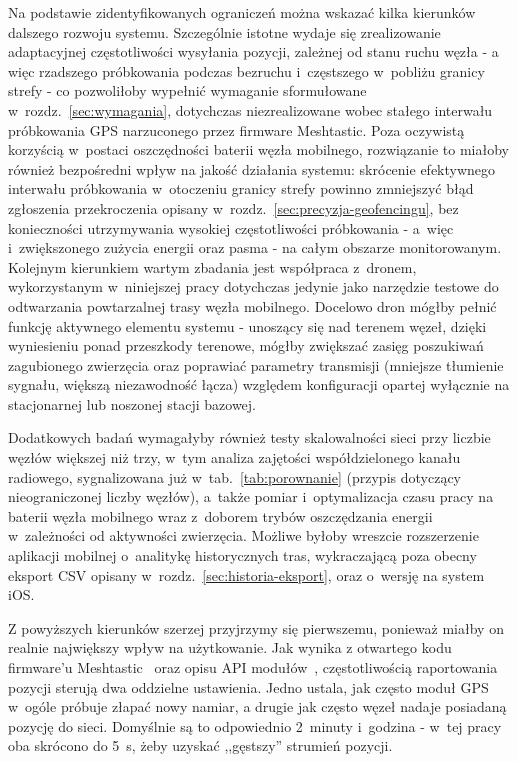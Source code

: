 Na podstawie zidentyfikowanych ograniczeń można wskazać kilka kierunków dalszego rozwoju systemu.
Szczególnie istotne wydaje się zrealizowanie adaptacyjnej częstotliwości wysyłania pozycji,
zależnej od stanu ruchu węzła - a więc rzadszego próbkowania podczas bezruchu i~częstszego
w~pobliżu granicy strefy - co pozwoliłoby wypełnić wymaganie sformułowane w~rozdz.~\ref{sec:wymagania},
dotychczas niezrealizowane wobec stałego interwału próbkowania GPS narzuconego przez firmware
Meshtastic. Poza oczywistą korzyścią w~postaci oszczędności baterii węzła mobilnego, rozwiązanie
to miałoby również bezpośredni wpływ na jakość działania systemu: skrócenie efektywnego interwału
próbkowania w~otoczeniu granicy strefy powinno zmniejszyć błąd zgłoszenia przekroczenia opisany
w~rozdz.~\ref{sec:precyzja-geofencingu}, bez konieczności utrzymywania wysokiej częstotliwości
próbkowania - a~więc i~zwiększonego zużycia energii oraz pasma - na całym obszarze monitorowanym.
Kolejnym kierunkiem wartym zbadania jest współpraca z~dronem, wykorzystanym w~niniejszej
pracy dotychczas jedynie jako narzędzie testowe do odtwarzania powtarzalnej trasy węzła mobilnego.
Docelowo dron mógłby pełnić funkcję aktywnego elementu systemu - unoszący się nad terenem węzeł, 
dzięki wyniesieniu ponad przeszkody terenowe, mógłby zwiększać zasięg poszukiwań zagubionego 
zwierzęcia oraz poprawiać parametry transmisji (mniejsze tłumienie sygnału, większą niezawodność łącza)
względem konfiguracji opartej wyłącznie na stacjonarnej lub noszonej stacji bazowej.

Dodatkowych badań wymagałyby również testy skalowalności sieci przy liczbie węzłów większej niż
trzy, w~tym analiza zajętości współdzielonego kanału radiowego, sygnalizowana już w~tab.~\ref{tab:porownanie}
(przypis dotyczący nieograniczonej liczby węzłów), a~także pomiar i~optymalizacja czasu pracy na
baterii węzła mobilnego wraz z~doborem trybów oszczędzania energii w~zależności od aktywności
zwierzęcia. Możliwe byłoby wreszcie rozszerzenie aplikacji mobilnej o~analitykę historycznych tras,
wykraczającą poza obecny eksport CSV opisany w~rozdz.~\ref{sec:historia-eksport}, oraz o~wersję
na system iOS.

Z powyższych kierunków szerzej przyjrzymy się pierwszemu, ponieważ miałby on realnie największy wpływ na użytkowanie.
Jak wynika z otwartego kodu firmware'u Meshtastic~\cite{meshtasticFirmwareRepo} oraz opisu API
modułów~\cite{meshtasticModuleApiDocs}, częstotliwością raportowania pozycji sterują dwa oddzielne ustawienia. Jedno ustala, jak często moduł GPS
w~ogóle próbuje złapać nowy namiar, a drugie jak często węzeł nadaje posiadaną pozycję do sieci.
Domyślnie są to odpowiednio 2~minuty i~godzina - w~tej pracy oba skrócono do 5~s, żeby uzyskać
,,gęstszy'' strumień pozycji.

